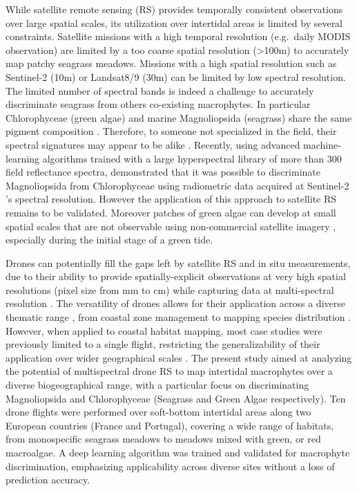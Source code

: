 \documentclass[
  number]{elsarticle}
\begin{document}
While satellite remote sensing (RS) provides temporally consistent
observations over large spatial scales, its utilization over intertidal
areas is limited by several constraints. Satellite missions with a high
temporal resolution (e.g.~daily MODIS observation) are limited by a too
coarse spatial resolution (\textgreater100m) to accurately map patchy
seagrass meadows. Missions with a high spatial resolution such as
Sentinel-2 (10m) or Landsat8/9 (30m) can be limited by low spectral
resolution. The limited number of spectral bands is indeed a challenge
to accurately discriminate seagrass from others co-existing macrophytes.
In particular Chlorophyceae (green algae) and marine Magnoliopsida
(seagrass) share the same pigment composition \citetext{\citealp[
]{ralph2002}; \citealp{Douay2022}}. Therefore, to someone not
specialized in the field, their spectral signatures may appear to be
alike \citetext{\citealp[ ]{Davies2023}; \citealp{bannari2022}}.
Recently, using advanced machine-learning algorithms trained with a
large hyperspectral library of more than 300 field reflectance spectra,
\citep{Davies2023} demonstrated that it was possible to discriminate
Magnoliopsida from Chlorophyceae using radiometric data acquired at
Sentinel-2 's spectral resolution. However the application of this
approach to satellite RS remains to be validated. Moreover patches of
green algae can develop at small spatial scales that are not observable
using non-commercial satellite imagery \citep{tuya2013}, especially
during the initial stage of a green tide.

Drones can potentially fill the gaps left by satellite RS and in situ
measurements, due to their ability to provide spatially-explicit
observations at very high spatial resolutions (pixel size from mm to cm)
while capturing data at multi-spectral resolution \citetext{\citealp[
]{fairley2022drone}; \citealp{oh2017use}}. The versatility of drones
allows for their application across a diverse thematic range , from
coastal zone management \citetext{\citealp[ ]{adade2021}; \citealp[
]{casella2020}; \citealp{angnuureng2022}} to mapping species
distribution \citetext{\citealp[ ]{joyce2023}; \citealp[
]{tallam2023}; \citealp[ ]{Roca2022}; \citealp[
]{Roman2021}; \citealp{Brunier2022Topographic}}. However, when applied
to coastal habitat mapping, most case studies were previously limited to
a single flight, restricting the generalizability of their application
over wider geographical scales \citetext{\citealp[
]{Roman2021}; \citealp[ ]{collin2019improving}; \citealp[
]{rossiter2020uav}; \citealp{Brunier2022Topographic}}. The present study
aimed at analyzing the potential of multispectral drone RS to map
intertidal macrophytes over a diverse biogeographical range, with a
particular focus on discriminating Magnoliopsida and Chlorophyceae
(Seagrass and Green Algae respectively). Ten drone flights were
performed over soft-bottom intertidal areas along two European countries
(France and Portugal), covering a wide range of habitats, from
monospecific seagrass meadows to meadows mixed with green, or red
macroalgae. A deep learning algorithm was trained and validated for
macrophyte discrimination, emphasizing applicability across diverse
sites without a loss of prediction accuracy.
\end{document}
